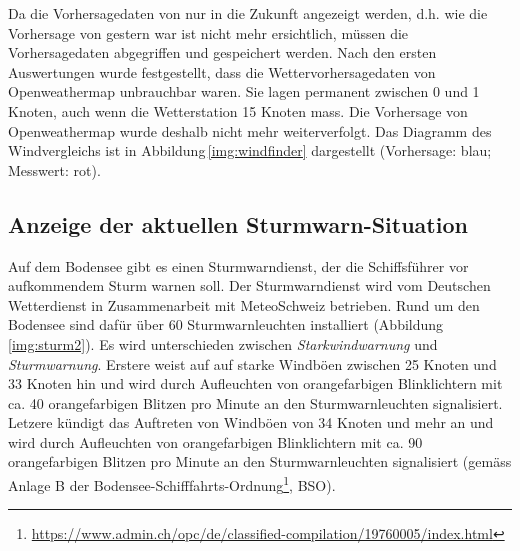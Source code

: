 Da die Vorhersagedaten von nur in die Zukunft angezeigt werden, d.h. wie die Vorhersage von gestern war ist nicht mehr ersichtlich, müssen die Vorhersagedaten abgegriffen und gespeichert werden. Nach den ersten Auswertungen wurde festgestellt, dass die Wettervorhersagedaten von Openweathermap unbrauchbar waren. Sie lagen permanent zwischen 0 und 1 Knoten, auch wenn die Wetterstation 15 Knoten mass. Die Vorhersage von Openweathermap wurde deshalb nicht mehr weiterverfolgt. Das Diagramm des Windvergleichs ist in Abbildung\,\ref{img:windfinder} dargestellt (Vorhersage: blau; Messwert: rot).





\subsection{Anzeige der aktuellen Sturmwarn-Situation}
\label{subsec:sturmwarnung}

Auf dem Bodensee gibt es einen Sturmwarndienst, der die Schiffsführer vor aufkommendem Sturm warnen soll. Der Sturmwarndienst wird vom Deutschen Wetterdienst in Zusammenarbeit mit MeteoSchweiz betrieben. Rund um den Bodensee sind dafür über 60 Sturmwarnleuchten installiert (Abbildung \ref{img:sturm2}). Es wird unterschieden zwischen \textit{Starkwindwarnung} und \textit{Sturmwarnung}. Erstere weist auf auf starke Windböen zwischen 25 Knoten und 33 Knoten hin und wird durch Aufleuchten von orangefarbigen Blinklichtern mit ca. 40 orangefarbigen Blitzen pro Minute an den Sturmwarnleuchten signalisiert. Letzere kündigt das Auftreten von Windböen von 34 Knoten und mehr an und wird durch Aufleuchten von orangefarbigen Blinklichtern mit ca. 90 orangefarbigen Blitzen pro Minute an den Sturmwarnleuchten signalisiert (gemäss Anlage B der Bodensee-Schifffahrts-Ordnung\footnote{ \url{https://www.admin.ch/opc/de/classified-compilation/19760005/index.html}}, BSO).

